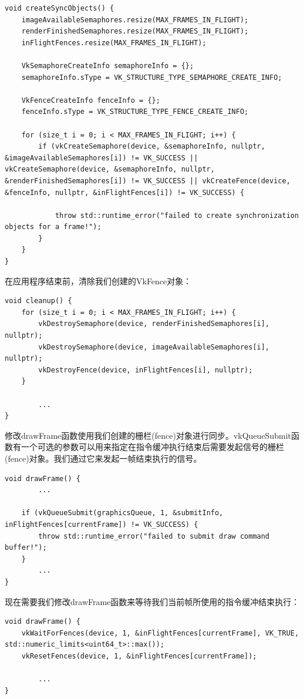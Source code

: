 \documentclass{ctexart}
\begin{document}
\begin{lstlisting}[language={[ANSI]C}]
void createSyncObjects() {
	imageAvailableSemaphores.resize(MAX_FRAMES_IN_FLIGHT);
	renderFinishedSemaphores.resize(MAX_FRAMES_IN_FLIGHT);
	inFlightFences.resize(MAX_FRAMES_IN_FLIGHT);

	VkSemaphoreCreateInfo semaphoreInfo = {};
	semaphoreInfo.sType = VK_STRUCTURE_TYPE_SEMAPHORE_CREATE_INFO;

	VkFenceCreateInfo fenceInfo = {};
	fenceInfo.sType = VK_STRUCTURE_TYPE_FENCE_CREATE_INFO;

	for (size_t i = 0; i < MAX_FRAMES_IN_FLIGHT; i++) {
		if (vkCreateSemaphore(device, &semaphoreInfo, nullptr, &imageAvailableSemaphores[i]) != VK_SUCCESS || vkCreateSemaphore(device, &semaphoreInfo, nullptr, &renderFinishedSemaphores[i]) != VK_SUCCESS || vkCreateFence(device, &fenceInfo, nullptr, &inFlightFences[i]) != VK_SUCCESS) {

			throw std::runtime_error("failed to create synchronization objects for a frame!");
		}
	}
}
\end{lstlisting}

在应用程序结束前，清除我们创建的VkFence对象：

\begin{lstlisting}[language={[ANSI]C}]
void cleanup() {
	for (size_t i = 0; i < MAX_FRAMES_IN_FLIGHT; i++) {
		vkDestroySemaphore(device, renderFinishedSemaphores[i], nullptr);
		vkDestroySemaphore(device, imageAvailableSemaphores[i], nullptr);
		vkDestroyFence(device, inFlightFences[i], nullptr);
	}

		...
}
\end{lstlisting}

修改drawFrame函数使用我们创建的栅栏(fence)对象进行同步。vkQueueSubmit函数有一个可选的参数可以用来指定在指令缓冲执行结束后需要发起信号的栅栏(fence)对象。我们通过它来发起一帧结束执行的信号。

\begin{lstlisting}[language={[ANSI]C}]
void drawFrame() {
		...

	if (vkQueueSubmit(graphicsQueue, 1, &submitInfo, inFlightFences[currentFrame]) != VK_SUCCESS) {
		throw std::runtime_error("failed to submit draw command buffer!");
	}
		...
}
\end{lstlisting}

现在需要我们修改drawFrame函数来等待我们当前帧所使用的指令缓冲结束执行：

\begin{lstlisting}[language={[ANSI]C}]
void drawFrame() {
	vkWaitForFences(device, 1, &inFlightFences[currentFrame], VK_TRUE, std::numeric_limits<uint64_t>::max());
	vkResetFences(device, 1, &inFlightFences[currentFrame]);

		...
}
\end{lstlisting}
\end{document}
